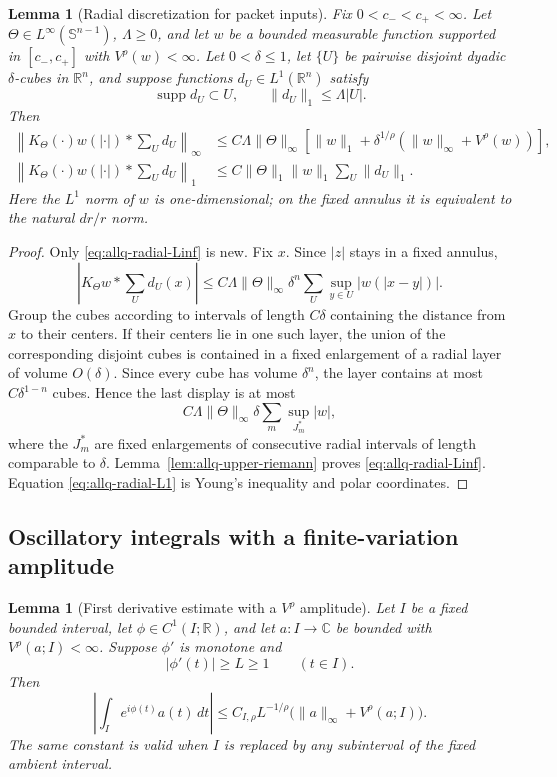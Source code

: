 \documentclass[11pt]{article}
\numberwithin{equation}{section}
\newtheorem{lemma}[theorem]{Lemma}
\theoremstyle{remark}
\theoremstyle{definition}
\newcommand{\R}{\mathbb R}
\newcommand{\Sph}{\mathbb S}
\newcommand{\supp}{\operatorname{supp}}
\begin{document}
\begin{lemma}[Radial discretization for packet inputs]
\label{lem:allq-radial-discretization}
Fix $0<c_-<c_+<\infty$.  Let $\Theta\in L^\infty(\Sph^{n-1})$,
$\Lambda\ge0$, and let $w$ be a bounded measurable function supported in
$[c_-,c_+]$ with $V^\rho(w)<\infty$.  Let $0<\delta\le1$, let $\{U\}$ be pairwise
disjoint dyadic $\delta$-cubes in $\R^n$, and suppose functions $d_U\in L^1(\R^n)$ satisfy
\[
 \supp d_U\subset U,
 \qquad \|d_U\|_1\le\Lambda|U|.
\]
Then
\begin{align}
 \left\|K_\Theta(\cdot)w(|\cdot|)*\sum_Ud_U\right\|_\infty
 &\le C\Lambda\|\Theta\|_\infty
 \left[
 \|w\|_1+
 \delta^{1/\rho}(\|w\|_\infty+V^\rho(w))
 \right],
 \label{eq:allq-radial-Linf}\\
 \left\|K_\Theta(\cdot)w(|\cdot|)*\sum_Ud_U\right\|_1
 &\le C\|\Theta\|_1\|w\|_1\sum_U\|d_U\|_1.
 \label{eq:allq-radial-L1}
\end{align}
Here the $L^1$ norm of $w$ is one-dimensional; on the fixed annulus it is
equivalent to the natural $dr/r$ norm.
\end{lemma}

\begin{proof}
Only \eqref{eq:allq-radial-Linf} is new.  Fix $x$.  Since $|z|$ stays in a
fixed annulus,
\[
 \left|K_\Theta w*\sum_Ud_U(x)\right|
 \le C\Lambda\|\Theta\|_\infty
 \delta^n\sum_U\sup_{y\in U}|w(|x-y|)|.
\]
Group the cubes according to intervals of length $C\delta$ containing the
distance from $x$ to their centers.  If their centers lie in one such
layer, the union of the corresponding disjoint cubes is contained in a
fixed enlargement of a radial layer of volume $O(\delta)$.  Since every
cube has volume $\delta^n$, the layer contains at most
$C\delta^{1-n}$ cubes.  Hence the last display is at most
\[
 C\Lambda\|\Theta\|_\infty
 \delta\sum_m\sup_{J_m^*}|w|,
\]
where the $J_m^*$ are fixed enlargements of consecutive radial intervals of
length comparable to $\delta$.  Lemma~\ref{lem:allq-upper-riemann} proves
\eqref{eq:allq-radial-Linf}.  Equation \eqref{eq:allq-radial-L1} is Young's
inequality and polar coordinates.
\end{proof}

\subsection{Oscillatory integrals with a finite-variation amplitude}

\begin{lemma}[First derivative estimate with a $V^\rho$ amplitude]
\label{lem:allq-first-derivative}
Let $I$ be a fixed bounded interval, let $\phi\in C^1(I;\mathbb R)$, and
let $a:I\to\mathbb C$ be bounded with $V^\rho(a;I)<\infty$.  Suppose
$\phi'$ is monotone and
\[
 |\phi'(t)|\ge L\ge1\qquad(t\in I).
\]
Then
\begin{equation}\label{eq:allq-first-derivative}
 \left|\int_Ie^{i\phi(t)}a(t)\,dt\right|
 \le C_{I,\rho}L^{-1/\rho}
 \bigl(\|a\|_\infty+V^\rho(a;I)\bigr).
\end{equation}
The same constant is valid when $I$ is replaced by any subinterval of the
fixed ambient interval.
\end{lemma}
\end{document}

